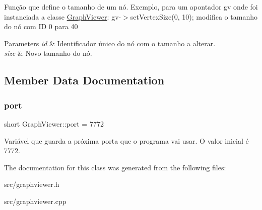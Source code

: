 Função que define o tamanho de um nó. Exemplo, para um apontador gv onde foi instanciada a classe \mbox{\hyperlink{class_graph_viewer}{Graph\+Viewer}}\+: gv-\/$>$set\+Vertex\+Size(0, 10); modifica o tamanho do nó com ID 0 para 40


\begin{DoxyParams}{Parameters}
{\em id} & Identificador único do nó com o tamanho a alterar. \\
\hline
{\em size} & Novo tamanho do nó. \\
\hline
\end{DoxyParams}


\subsection{Member Data Documentation}
\mbox{\label{class_graph_viewer_a89d0abe75f41feededc49497cc514342}} 
\subsubsection{\texorpdfstring{port}{port}}
{\footnotesize\ttfamily short Graph\+Viewer\+::port = 7772\hspace{0.3cm}{\ttfamily [static]}}

Variável que guarda a próxima porta que o programa vai usar. O valor inicial é 7772. 

The documentation for this class was generated from the following files\+:\begin{DoxyCompactItemize}
\item 
src/graphviewer.\+h\item 
src/graphviewer.\+cpp\end{DoxyCompactItemize}
